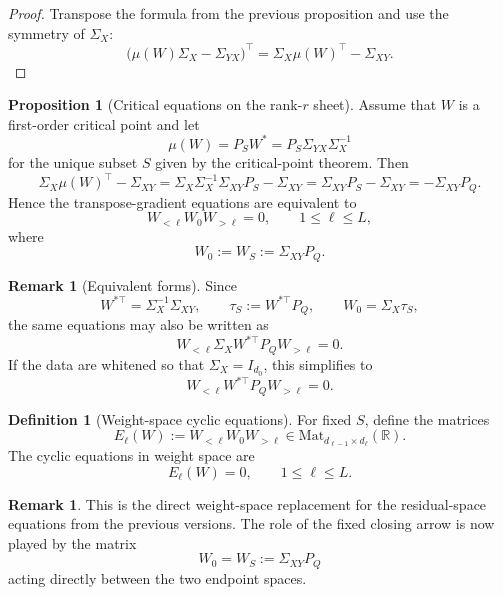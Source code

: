 \documentclass{article}
\newcommand{\Mat}{\mathrm{Mat}}
\theoremstyle{definition}
\newtheorem{proposition}[theorem]{Proposition}
\newtheorem{definition}[theorem]{Definition}
\newtheorem{remark}[theorem]{Remark}
\begin{document}
\begin{proof}
Transpose the formula from the previous proposition and use the symmetry of $\Sigma_X$:
\[
\bigl(\mu(W)\Sigma_X-\Sigma_{YX}\bigr)^\top
=
\Sigma_X\mu(W)^\top-\Sigma_{XY}.
\]
\end{proof}

\begin{proposition}[Critical equations on the rank-$r$ sheet]
Assume that $W$ is a first-order critical point and let
\[
\mu(W)=P_S W^\ast
=
P_S\Sigma_{YX}\Sigma_X^{-1}
\]
for the unique subset $S$ given by the critical-point theorem. Then
\[
\Sigma_X\mu(W)^\top-\Sigma_{XY}
=
\Sigma_X\Sigma_X^{-1}\Sigma_{XY}P_S-\Sigma_{XY}
=
\Sigma_{XY}P_S-\Sigma_{XY}
=
-\Sigma_{XY}P_Q.
\]
Hence the transpose-gradient equations are equivalent to
\[
W_{<\ell}W_0 W_{>\ell}=0,
\qquad
1\leq \ell\leq L,
\]
where
\[
W_0:=W_S:=\Sigma_{XY}P_Q.
\]
\end{proposition}

\begin{remark}[Equivalent forms]
Since
\[
W^{\ast\top}=\Sigma_X^{-1}\Sigma_{XY},
\qquad
\tau_S:=W^{\ast\top}P_Q,
\qquad
W_0=\Sigma_X\tau_S,
\]
the same equations may also be written as
\[
W_{<\ell}\Sigma_XW^{\ast\top}P_QW_{>\ell}=0.
\]
If the data are whitened so that $\Sigma_X=I_{d_0}$, this simplifies to
\[
W_{<\ell}W^{\ast\top}P_QW_{>\ell}=0.
\]
\end{remark}

\begin{definition}[Weight-space cyclic equations]\label{def:weight-space-cyclic-equations}
For fixed $S$, define the matrices
\[
E_\ell(W):=W_{<\ell}W_0W_{>\ell}
\in \Mat_{d_{\ell-1}\times d_\ell}(\mathbb R).
\]
The cyclic equations in weight space are
\[
E_\ell(W)=0,
\qquad
1\leq \ell\leq L.
\]
\end{definition}

\begin{remark}
This is the direct weight-space replacement for the residual-space equations from the previous versions. The role of the fixed closing arrow is now played by the matrix
\[
W_0=W_S:=\Sigma_{XY}P_Q
\]
acting directly between the two endpoint spaces.
\end{remark}
\end{document}
